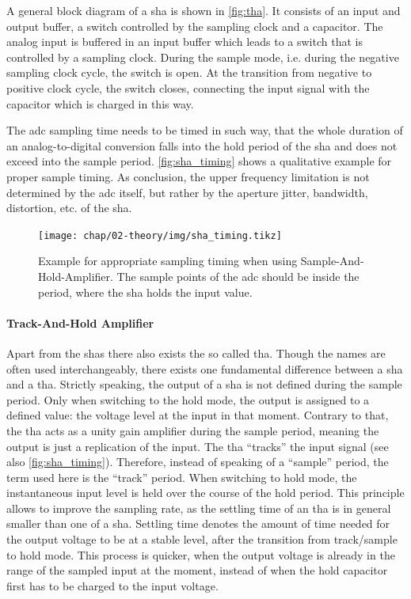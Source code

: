 A general block diagram of a \gls{sha} is shown in \autoref{fig:tha}. %
It consists of an input and output buffer, a switch controlled by the sampling clock and a capacitor.
The analog input is buffered in an input buffer which leads to a switch that is controlled by a sampling clock.
During the sample mode, i.e. during the negative sampling clock cycle, the switch is open.
At the transition from negative to positive clock cycle, the switch closes, connecting the input signal with the capacitor which is charged in this way.

The \gls{adc} sampling time needs to be timed in such way, that the whole duration of an analog-to-digital conversion falls into the hold period of the \gls{sha} and does not exceed into the sample period. 
\autoref{fig:sha_timing} shows a qualitative example for proper sample timing. 
As conclusion, the upper frequency limitation is not determined by the \gls{adc} itself, but rather by the aperture jitter, bandwidth, distortion, etc. of the \gls{sha}. \cite{walt}

\begin{figure} [H]
	\centering
	\tikzexternaldisable
	\texttt{[image: chap/02-theory/img/sha\_timing.tikz]}  
	\tikzexternalenable
	\caption[SHA timing example]{Example for appropriate sampling timing when using Sample-And-Hold-Amplifier. The sample points of the \gls{adc} should be inside the period, where the \gls{sha} holds the input value.}
	\label{fig:sha_timing}
\end{figure}
\paragraph{Track-And-Hold Amplifier}
Apart from the \glspl{sha} there also exists the so called \gls{tha}.
Though the names are often used interchangeably, there exists one fundamental difference between a \gls{sha} and a \gls{tha}.
Strictly speaking, the output of a \gls{sha} is not defined during the sample period. 
Only when switching to the hold mode, the output is assigned to a defined value: the voltage level at the input in that moment.
Contrary to that, the \gls{tha} acts as a unity gain amplifier during the sample period, meaning the output is just a replication of the input. 
The \gls{tha} ``tracks'' the input signal (see also \autoref{fig:sha_timing}).
Therefore, instead of speaking of a ``sample'' period, the term used here is the ``track'' period.
When switching to hold mode, the instantaneous input level is held over the course of the hold period.
This principle allows to improve the sampling rate, as the settling time of an \gls{tha} is in general smaller than one of a \gls{sha}.
Settling time denotes the amount of time needed for the output voltage to be at a stable level, after the transition from track/sample to hold mode.
This process is quicker, when the output voltage is already in the range of the sampled input at the moment, instead of when the hold capacitor first has to be charged to the input voltage. \cite{Reeder2017}


